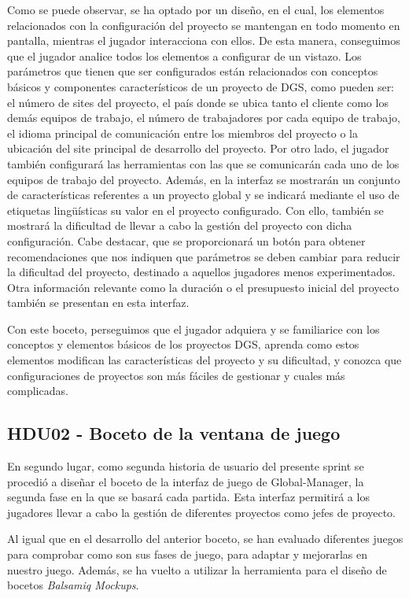 Como se puede observar, se ha optado por un diseño, en el cual, los elementos relacionados con la configuración del proyecto se mantengan en todo momento en pantalla, mientras el jugador interacciona con ellos. De esta manera, conseguimos que el jugador analice todos los elementos a configurar de un vistazo. Los parámetros que tienen que ser configurados están relacionados con conceptos básicos y componentes característicos de un proyecto de DGS, como pueden ser: el número de sites del proyecto, el país donde se ubica tanto el cliente como los demás equipos de trabajo, el número de trabajadores por cada equipo de trabajo, el idioma principal de comunicación entre los miembros del proyecto o la ubicación del site principal de desarrollo del proyecto. Por otro lado, el jugador también configurará las herramientas con las que se comunicarán cada uno de los equipos de trabajo del proyecto. Además, en la interfaz se mostrarán un conjunto de características referentes a un proyecto global y se indicará mediante el uso de etiquetas lingüísticas su valor en el proyecto configurado. Con ello, también se mostrará la dificultad de llevar a cabo la gestión del proyecto con dicha configuración. Cabe destacar, que se proporcionará un botón para obtener recomendaciones que nos indiquen que parámetros se deben cambiar para reducir la dificultad del proyecto, destinado a aquellos jugadores menos experimentados. Otra información relevante como la duración o el presupuesto inicial del proyecto también se presentan en esta interfaz.

Con este boceto, perseguimos que el jugador adquiera y se familiarice con los conceptos y elementos básicos de los proyectos DGS, aprenda como estos elementos modifican las características del proyecto y su dificultad, y conozca que configuraciones de proyectos son más fáciles de gestionar y cuales más complicadas.

\subsection{HDU02 - Boceto de la ventana de juego}
\label{sec:HDU02}

En segundo lugar, como segunda historia de usuario del presente sprint se procedió a diseñar el boceto de la interfaz de juego de Global-Manager, la segunda fase en la que se basará cada partida. Esta interfaz permitirá a los jugadores llevar a cabo la gestión de diferentes proyectos como jefes de proyecto.

Al igual que en el desarrollo del anterior boceto, se han evaluado diferentes juegos para comprobar como son sus fases de juego, para adaptar y mejorarlas en nuestro juego. Además, se ha vuelto a utilizar la herramienta para el diseño de bocetos \emph{Balsamiq Mockups}.

